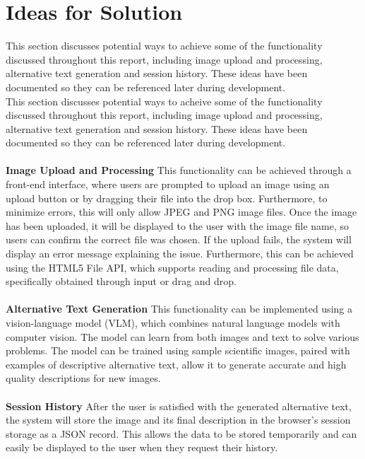 \documentclass[12pt]{article}
\begin{document}
\section{Ideas for Solution}
This section discusses potential ways to achieve some of the functionality discussed throughout this report, 
including image upload and processing, alternative text generation and session history. 
These ideas have been documented so they can be referenced later during development.\\
This section discusses potential ways to acheive some of the
functionality discussed throughout this report,
including image upload and processing, alternative text generation
and session history.
These ideas have been documented so they can be referenced later
during development.\\
\\
\textbf{Image Upload and Processing}
This functionality can be achieved through a front-end interface,
where users are prompted to upload an image using an upload button or
by dragging their file into the drop box. Furthermore, to minimize
errors, this will only allow JPEG and PNG image files.
Once the image has been uploaded, it will be displayed to the user
with the image file name, so users can confirm the correct file was chosen.
If the upload fails, the system will display an error message
explaining the issue. Furthermore, this can be achieved using the
HTML5 File API, which supports reading and processing file data,
specifically obtained through input or drag and drop. \\
\\
\textbf{Alternative Text Generation}
This functionality can be implemented using a vision-language model
(VLM), which combines natural language models with computer vision.
The model can learn from both images and text to solve various
problems. The model can be trained using sample scientific images,
paired with examples of descriptive alternative text, allow it to
generate accurate and high quality descriptions for new images.\\
\\
\textbf{Session History}
After the user is satisfied with the generated alternative text, the system will store the image and its final description in the browser's session storage as a JSON record. This allows the data to be stored temporarily and can easily be displayed to the user when they request their history. \\
\end{document}
